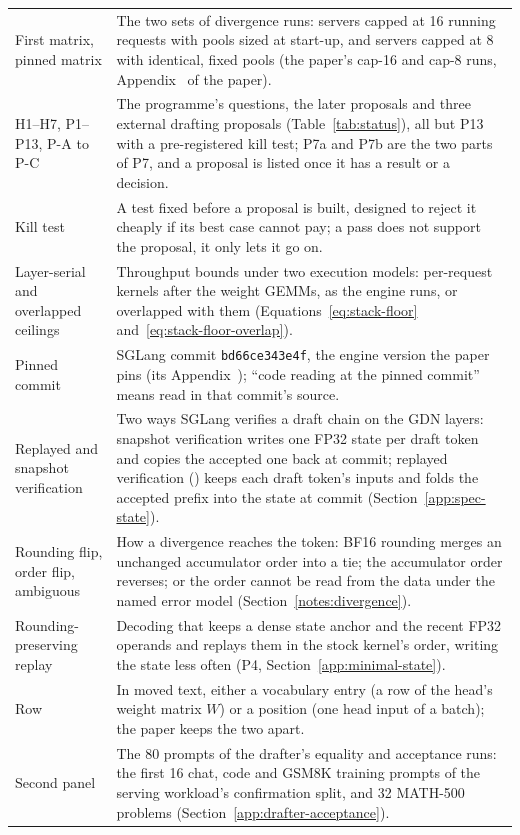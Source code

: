 {\begin{longtable}{@{}P{4.4cm}P{12.1cm}@{}}
First matrix, pinned matrix & The two sets of divergence runs: servers capped at 16 running requests with pools sized at start-up, and servers capped at 8 with identical, fixed pools (the paper's cap-16 and cap-8 runs, Appendix~ of the paper).\\
H1--H7, P1--P13, P-A to P-C & The programme's questions, the later proposals and three external drafting proposals (Table~\ref{tab:status}), all but P13 with a pre-registered kill test; P7a and P7b are the two parts of P7, and a proposal is listed once it has a result or a decision.\\
Kill test & A test fixed before a proposal is built, designed to reject it cheaply if its best case cannot pay; a pass does not support the proposal, it only lets it go on.\\
Layer-serial and overlapped ceilings & Throughput bounds under two execution models: per-request kernels after the weight GEMMs, as the engine runs, or overlapped with them (Equations~\eqref{eq:stack-floor} and~\eqref{eq:stack-floor-overlap}).\\
Pinned commit & SGLang commit \texttt{bd66ce343e4f}, the engine version the paper pins (its Appendix~); ``code reading at the pinned commit'' means read in that commit's source.\\
Replayed and snapshot verification & Two ways SGLang verifies a draft chain on the GDN layers: snapshot verification writes one FP32 state per draft token and copies the accepted one back at commit; replayed verification () keeps each draft token's inputs and folds the accepted prefix into the state at commit (Section~\ref{app:spec-state}).\\
Rounding flip, order flip, ambiguous & How a divergence reaches the token: BF16 rounding merges an unchanged accumulator order into a tie; the accumulator order reverses; or the order cannot be read from the data under the named error model (Section~\ref{notes:divergence}).\\
Rounding-preserving replay & Decoding that keeps a dense state anchor and the recent FP32 operands and replays them in the stock kernel's order, writing the state less often (P4, Section~\ref{app:minimal-state}).\\
Row & In moved text, either a vocabulary entry (a row of the head's weight matrix $W$) or a position (one head input of a batch); the paper keeps the two apart.\\
Second panel & The 80 prompts of the drafter's equality and acceptance runs: the first 16 chat, code and GSM8K training prompts of the serving workload's confirmation split, and 32 MATH-500 problems (Section~\ref{app:drafter-acceptance}).\\

\end{longtable}}
